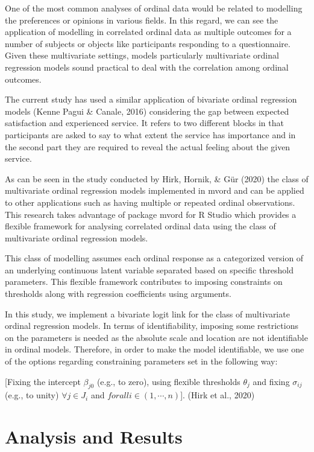 \documentclass[
11pt, %
oneside, %
english, %
singlespacing, %
]{macthesis} %
\begin{document}
One of the most common analyses of ordinal data would be related to modelling the preferences or opinions in various fields. In this regard, we can see the application of modelling in correlated ordinal data as multiple outcomes for a number of subjects or objects like participants responding to a questionnaire. Given these multivariate settings, models particularly multivariate ordinal regression models sound practical to deal with the correlation among ordinal outcomes.

The current study has used a similar application of bivariate ordinal regression models (Kenne Pagui \& Canale, 2016) considering the gap between expected satisfaction and experienced service. It refers to two different blocks in that participants are asked to say to what extent the service has importance and in the second part they are required to reveal the actual feeling about the given service.

As can be seen in the study conducted by Hirk, Hornik, \& Gür (2020) the class of multivariate ordinal regression models implemented in mvord and can be applied to other applications such as having multiple or repeated ordinal observations. This research takes advantage of package mvord for R Studio which provides a flexible framework for analysing correlated ordinal data using the class of multivariate ordinal regression models.

This class of modelling assumes each ordinal response as a categorized version of an underlying continuous latent variable separated based on specific threshold parameters. This flexible framework contributes to imposing constraints on thresholds along with regression coefficients using arguments.

In this study, we implement a bivariate logit link for the class of multivariate ordinal regression models. In terms of identifiability, imposing some restrictions on the parameters is needed as the absolute scale and location are not identifiable in ordinal models. Therefore, in order to make the model identifiable, we use one of the options regarding constraining parameters set in the following way:

{[}Fixing the intercept \(\beta_{j0}\) (e.g., to zero), using flexible thresholds \(\theta_j\) and fixing \(\sigma_{ij}\) (e.g., to unity) \(\forall j \in J_i\) and \(forall i \in (1, \cdots, n)\){]}.
(Hirk et al., 2020)

\hypertarget{analysis-and-results}{%
\section{Analysis and Results}\label{analysis-and-results}}
\end{document}

